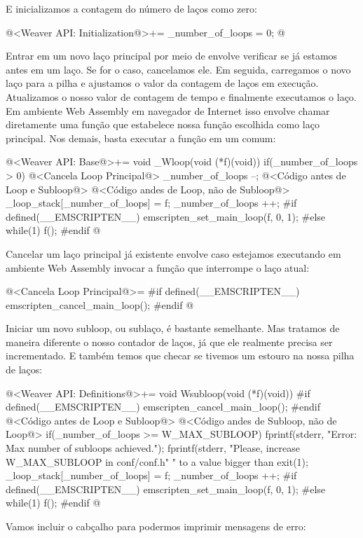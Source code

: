 E inicializamos a contagem do número de laços como zero:

\iniciocodigo
@<Weaver API: Initialization@>+=
_number_of_loops = 0;
@
\fimcodigo

Entrar em um novo laço principal por meio de 
envolve verificar se já estamos antes em um laço. Se for o caso,
cancelamos ele. Em seguida, carregamos o novo laço para a pilha e
ajustamos o valor da contagem de laços em execução. Atualizamos o
nosso valor de contagem de tempo e finalmente executamos o laço. Em
ambiente Web Assembly em navegador de Internet isso envolve chamar
diretamente uma função que estabelece nossa função escolhida como laço
principal. Nos demais, basta executar a função em
um  comum:

\iniciocodigo
@<Weaver API: Base@>+=
void _Wloop(void (*f)(void)){
  if(_number_of_loops > 0){
    @<Cancela Loop Principal@>
    _number_of_loops --;
  }
  @<Código antes de Loop e Subloop@>
  @<Código andes de Loop, não de Subloop@>
  _loop_stack[_number_of_loops] = f;
  _number_of_loops ++;
#if defined(__EMSCRIPTEN__)
  emscripten_set_main_loop(f, 0, 1);
#else
  while(1)
    f();
#endif
}
@
\fimcodigo

Cancelar um laço principal já existente envolve caso estejamos
executando em ambiente Web Assembly invocar a função que interrompe o
laço atual:

\iniciocodigo
@<Cancela Loop Principal@>=
#if defined(__EMSCRIPTEN__)
emscripten_cancel_main_loop();
#endif
@
\fimcodigo

Iniciar um novo subloop, ou sublaço, é bastante semelhante. Mas
tratamos de maneira diferente o nosso contador de laços, já que ele
realmente precisa ser incrementado. E também temos que checar se
tivemos um estouro na nossa pilha de laços:

\iniciocodigo
@<Weaver API: Definitions@>+=
void Wsubloop(void (*f)(void)){
#if defined(__EMSCRIPTEN__)
    emscripten_cancel_main_loop();
#endif
  @<Código antes de Loop e Subloop@>
  @<Código andes de Subloop, não de Loop@>
  if(_number_of_loops >= W_MAX_SUBLOOP){
    fprintf(stderr, "Error: Max number of subloops achieved.\n");
    fprintf(stderr, "Please, increase W_MAX_SUBLOOP in conf/conf.h"
            " to a value bigger than %
    exit(1);
  }
  _loop_stack[_number_of_loops] = f;
  _number_of_loops ++;
#if defined(__EMSCRIPTEN__)
  emscripten_set_main_loop(f, 0, 1);
#else
  while(1)
    f();
#endif
}
@
\fimcodigo

Vamos incluir o cabçalho para podermos imprimir mensagens de erro:

